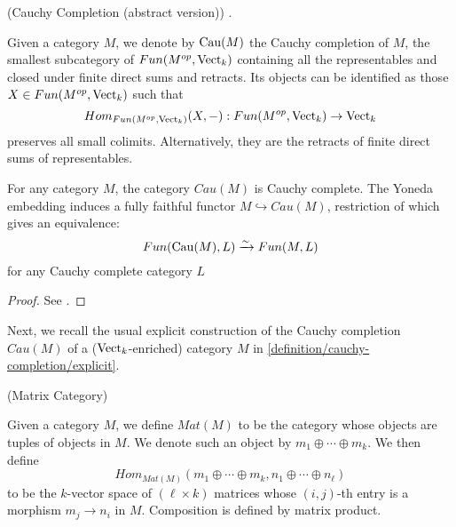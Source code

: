 
\begin{definition} \label{definition/cauchy-completion/abstract} (Cauchy Completion (abstract version)) \cite[Sections 5.5 and 5.7]{kelly/basic-concepts-enriched}.

  \noindent Given a category $M$, we denote by $\operatorname{Cau}(M)$ the Cauchy completion
  of $M$, the smallest subcategory of $Fun(M^{op},\operatorname{Vect}_k)$ containing
  all the representables and closed under finite direct sums and retracts. Its
  objects can be identified as those $X \in Fun(M^{op},\operatorname{Vect}_k)$ such that
  $$Hom_{Fun(M^{op},\operatorname{Vect}_k)}(X,-): Fun(M^{op},\operatorname{Vect}_k) \to \operatorname{Vect}_k$$ preserves all
  small colimits. Alternatively, they are the retracts of finite direct sums
  of representables.
\end{definition}
 
\begin{lemma}\label{univ_prop_cau}

  \noindent For any category $M$, the category $Cau(M)$ is Cauchy complete.
  The Yoneda embedding induces a fully faithful functor $M \hookrightarrow
  Cau(M)$, restriction of which gives an equivalence: $$Fun(\operatorname{Cau}(M),L)
  \xrightarrow{\sim} Fun(M,L)$$ for any Cauchy complete category $L$
\end{lemma}

\begin{proof}
  See \cite[Sections 5.5 and 5.7]{kelly/basic-concepts-enriched}.
\end{proof}

\noindent Next, we recall the usual explicit construction of the Cauchy
completion $Cau(M)$ of a ($\operatorname{Vect}_k$-enriched) category $M$ in
\ref{definition/cauchy-completion/explicit}.

\begin{definition} (Matrix Category)

  \noindent Given a category $M$, we define $Mat(M)$ to be the category whose
  objects are tuples of objects in $M$. We denote such an object by
  $m_1\oplus\cdots\oplus m_k$. We then
  define $$Hom_{Mat(M)}(m_1\oplus\cdots\oplus m_k,n_1\oplus\cdots\oplus
  n_{\ell})$$ to be the $k$-vector space of $(\ell\times k)$ matrices whose
  $(i,j)$-th entry is a morphism $m_j\to n_i$ in $M$. Composition is defined
  by matrix product.
\end{definition}

